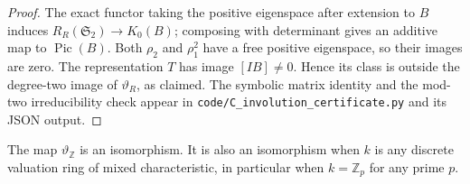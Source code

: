 \begin{proof}
The exact functor taking the positive eigenspace after extension to $B$
induces $R_R(\mathfrak S_2)\to K_0(B)$; composing with determinant gives
an additive map to $\operatorname{Pic}(B)$. Both $\rho_2$ and $\rho_1^2$
have a free positive eigenspace, so their images are zero. The representation
$T$ has image $[IB]\ne0$. Hence its class is outside the degree-two image
of $\vartheta_R$, as claimed. The symbolic matrix identity and the
mod-two irreducibility check appear in
\texttt{code/C\_involution\_certificate.py} and its JSON output.
\end{proof}

\begin{proposition}
\label{C:DVR}
The map $\vartheta_{\mathbb Z}$ is an isomorphism. It is also an isomorphism
when $k$ is any discrete valuation ring of mixed characteristic, in particular
when $k=\mathbb Z_p$ for any prime $p$.
\end{proposition}
